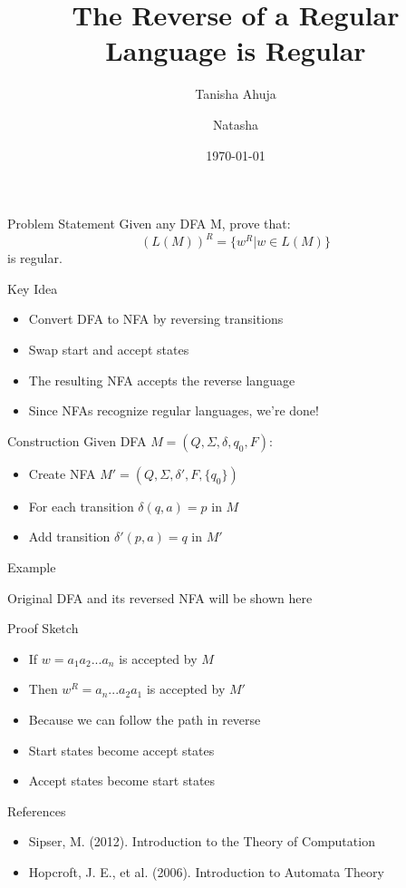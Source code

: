 \documentclass{beamer}
\title{The Reverse of a Regular Language is Regular}
\author{Tanisha Ahuja \and Natasha}
\institute{COMP 382}
\date{\today}
\begin{document}
\begin{frame}
\titlepage
\end{frame}

\begin{frame}{Problem Statement}
Given any DFA M, prove that:
\[ (L(M))^R = \{ w^R | w \in L(M) \} \]
is regular.
\end{frame}

\begin{frame}{Key Idea}
\begin{itemize}
    \item Convert DFA to NFA by reversing transitions
    \item Swap start and accept states
    \item The resulting NFA accepts the reverse language
    \item Since NFAs recognize regular languages, we're done!
\end{itemize}
\end{frame}

\begin{frame}{Construction}
Given DFA $M = (Q, \Sigma, \delta, q_0, F)$:
\begin{itemize}
    \item Create NFA $M' = (Q, \Sigma, \delta', F, \{q_0\})$
    \item For each transition $\delta(q,a) = p$ in $M$
    \item Add transition $\delta'(p,a) = q$ in $M'$
\end{itemize}
\end{frame}

\begin{frame}{Example}
\begin{center}
Original DFA and its reversed NFA will be shown here
\end{center}
\end{frame}

\begin{frame}{Proof Sketch}
\begin{itemize}
    \item If $w = a_1a_2...a_n$ is accepted by $M$
    \item Then $w^R = a_n...a_2a_1$ is accepted by $M'$
    \item Because we can follow the path in reverse
    \item Start states become accept states
    \item Accept states become start states
\end{itemize}
\end{frame}

\begin{frame}{References}
\begin{itemize}
    \item Sipser, M. (2012). Introduction to the Theory of Computation
    \item Hopcroft, J. E., et al. (2006). Introduction to Automata Theory
\end{itemize}
\end{frame}
\end{document}
